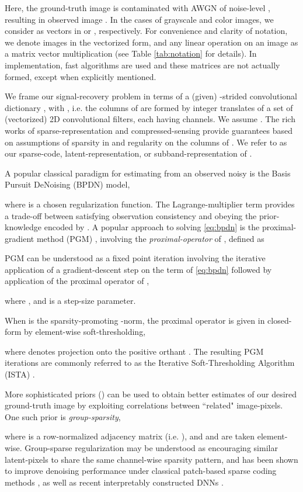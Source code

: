 \documentclass[lettersize,journal]{IEEEtran}
\begin{document}
Here, the ground-truth image  is contaminated with AWGN of noise-level , resulting in
observed image . In the cases of grayscale and color images,
we consider  as vectors in  or , respectively. 
For convenience and clarity of notation, we denote images in the vectorized form, and any
linear operation on an image as a matrix vector multiplication (see Table
\ref{tab:notation} for details). In implementation, fast algorithms are used
and these matrices are not actually formed, except when explicitly mentioned. 

We frame our signal-recovery problem in terms of a (given)
-strided convolutional dictionary , with , i.e. the
columns of  are
formed by integer translates of a set of  (vectorized) 2D convolutional
filters, each having  channels.
We assume . 
The rich works of sparse-representation and compressed-sensing
provide guarantees based on assumptions of sparsity in  and regularity on
the columns of  \cite{Mallat}. We refer to  as our sparse-code,
latent-representation, or subband-representation of .

A popular classical paradigm for estimating  from an observed
noisy  is the Basis Pursuit DeNoising (BPDN) model, 

where  is a chosen regularization function. The
Lagrange-multiplier term  provides a trade-off between satisfying
observation consistency and obeying the prior-knowledge encoded by . A
popular approach to solving \eqref{eq:bpdn} is the proximal-gradient method
(PGM) \cite{Beck2009}, involving the {\it proximal-operator} of , defined as  

PGM can be understood as a fixed point iteration involving the iterative application
of a gradient-descent step on the  term of \eqref{eq:bpdn} followed by 
application of the proximal operator of ,

where ,  and  is a step-size parameter.

When  is the sparsity-promoting -norm, the proximal operator is
given in closed-form by element-wise soft-thresholding,

where  denotes projection onto the positive orthant . 
The resulting PGM iterations are commonly referred
to as the Iterative Soft-Thresholding Algorithm (ISTA) \cite{Beck2009}.

More sophisticated priors () can be used to
obtain better estimates of our desired ground-truth image by exploiting
correlations between ``related" image-pixels. One such prior is
{\it group-sparsity}, 

where  is a row-normalized adjacency matrix (i.e.
), and  and  are taken element-wise.
Group-sparse regularization may be understood as
encouraging similar latent-pixels to share the same channel-wise sparsity pattern, and has
been shown to improve denoising performance under classical patch-based sparse coding
methods \cite{mairal2009non}, as well as recent interpretably constructed DNNs
\cite{lecouat2020nonlocal}.
\end{document}
